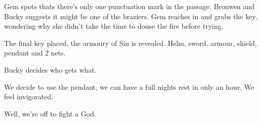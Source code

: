Gem spots thats there's only one punctuation mark in the passage. Bronwen and Bucky suggests it might be one of the braziers. Gem reaches in and grabs the key, wondering why she didn't take the time to douse the fire before trying.\medskip

The final key placed, the armoury of Sin is revealed. Helm, sword, armour, shield, pendant and 2 nets.\medskip

Bucky decides who gets what.\medskip

We decide to use the pendant, we can have a full nights rest in only an hour. We feel invigorated.\medskip

Well, we're off to fight a God.\medskip

\vspace*{5mm}
